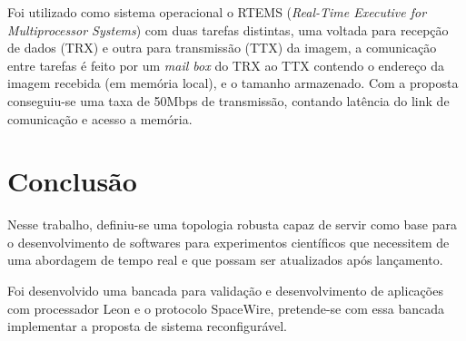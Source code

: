 \documentclass[journal,a4paper,oneside,twocolumn]{IEEEtran}
\begin{document}
	Foi utilizado como sistema operacional o RTEMS (\textit{Real-Time Executive for Multiprocessor Systems}) com duas tarefas distintas, uma voltada para recepção de dados (TRX) e outra para transmissão (TTX) da imagem, a comunicação entre tarefas é feito por um \textit{mail box} do TRX ao TTX contendo o endereço da imagem recebida (em memória local), e o tamanho armazenado. Com a proposta conseguiu-se uma taxa de 50Mbps de transmissão, contando latência do link de comunicação e acesso a memória. 
	
\section{Conclusão}	
		
		Nesse trabalho, definiu-se uma topologia robusta capaz de servir como base para o desenvolvimento de softwares para experimentos científicos que necessitem de uma abordagem de tempo real e que possam ser atualizados após lançamento. 
		
		Foi desenvolvido uma bancada para validação e desenvolvimento de aplicações com processador Leon e o protocolo SpaceWire, pretende-se com essa bancada  implementar a proposta de sistema reconfigurável.
	




%
%
\end{document}
